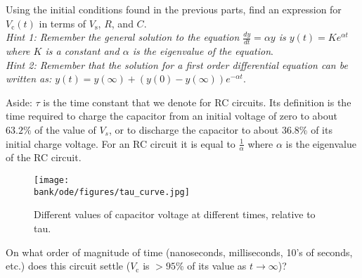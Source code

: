\begin{enumerate}
\qitem Using the initial conditions found in the previous parts, find an expression for $V_{\text{c}}(t)$ in terms of $V_{\text{s}}$, $R$, and $C$. \\ \textit{Hint 1: Remember the general solution to the equation $\frac{dy}{dt}=\alpha y$ is $y(t)=Ke^{\alpha t}$ where $K$ is a constant and $\alpha$ is the eigenvalue of the equation}. \\ \textit{Hint 2: Remember that the solution for a first order differential equation can be written as: $y(t) = y(\infty) + (y(0) - y(\infty)) e^{-\alpha t}$}.

\qitem Aside: $\tau$ is the time constant that we denote for RC circuits. Its definition is the time required to charge the capacitor from an initial voltage of zero to about $63.2\%$ of the value of $V_s$, or to discharge the capacitor to about $36.8\%$ of its initial charge voltage. For an RC circuit it is equal to $\frac{1}{\alpha}$ where $\alpha$ is the eigenvalue of the RC circuit.

\begin{figure}[h!]
  \centering
  \texttt{[image: \\bank/ode/figures/tau\_curve.jpg]}
  \caption{Different values of capacitor voltage at different times, relative to tau.}
  \label{fig:Tau Curve for Charging RC Circuit}
\end{figure}



\qitem On what order of magnitude of time (nanoseconds, milliseconds, 10's of seconds, etc.) does this circuit settle ($V_{\text{c}}$ is $>95\%$ of its value as $t \to \infty$)?

\sol{

}
\end{enumerate}
